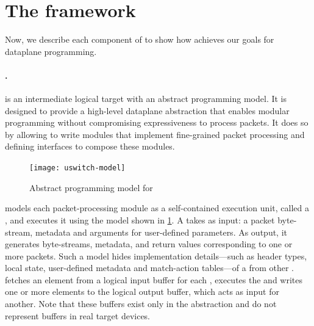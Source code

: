\documentclass[letterpaper,twocolumn,10pt]{article}
\begin{document}
\section{The \ulang framework}
\label{sec:microp4}
Now, we describe each component of \ulang to show how \ulang achieves
our goals for dataplane programming.

\paragraph{\uswitch.}
\uswitch is an intermediate logical target with an abstract
programming model. It is designed to provide a high-level dataplane
abstraction that enables modular programming without compromising
expressiveness to process packets. It does so by allowing to write
modules that implement fine-grained packet processing and defining
interfaces to compose these modules.
\begin{figure}[htb]
    \centering
    \texttt{[image: uswitch-model]}
    \caption{Abstract programming model for \uswitch}
    \label{fig:uswitch}
\end{figure}

\uswitch models each packet-processing module as a self-contained
execution unit, called a \emph{\uprogram}, and executes it using the
model shown in \cref{fig:uswitch}. A \uprogram takes as input: a
packet byte-stream, metadata and arguments for user-defined
parameters. As output, it generates byte-streams, metadata, and return
values corresponding to one or more packets. Such a model hides
implementation details---such as header types, local state,
user-defined metadata and match-action tables---of a \uprogram from
other \uprograms.  \uswitch fetches an element from a logical input
buffer for each \uprogram, executes the \uprogram and writes one or
more elements to the logical output buffer, which acts as input for
another. Note that these buffers exist only in the abstraction and do
not represent buffers in real target devices.
\end{document}
